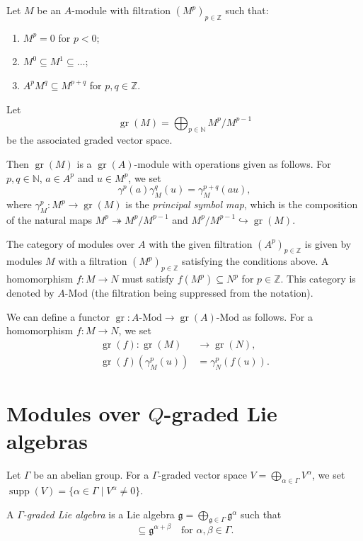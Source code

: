 \documentclass[a4paper, 12pt, reqno]{amsart}
\DeclareMathOperator{\gr}{gr}
\DeclareMathOperator{\supp}{supp}
\begin{document}
Let $M$ be an $A$-module with filtration $(M^p)_{p \in \mathbb{Z}}$ such that:
\begin{enumerate}
\item $M^p = 0$ for $p < 0$;
\item $M^0 \subseteq M^1 \subseteq \dots$;
\item $A^pM^q \subseteq M^{p + q}$ for $p, q \in \mathbb{Z}$.
\end{enumerate}
Let
\begin{equation*}
  \gr(M) = \bigoplus_{p \in \mathbb{N}}M^p/M^{p - 1}
\end{equation*}
be the associated graded vector space.

Then $\gr(M)$ is a $\gr(A)$-module with operations given as follows.
For $p, q \in \mathbb{N}$, $a \in A^p$ and $u \in M^p$, we set
\begin{equation*}
  \gamma^p(a)\gamma^q_M(u) = \gamma^{p + q}_M(au),
\end{equation*}
where $\gamma^p_M: M^p \to \gr(M)$ is the \emph{principal symbol map}, which is the composition of the natural maps $M^p \twoheadrightarrow M^p/M^{p - 1}$ and $M^p/M^{p - 1} \hookrightarrow \gr(M)$.

The category of modules over $A$ with the given filtration $(A^p)_{p \in \mathbb{Z}}$ is given by modules $M$ with a filtration $(M^p)_{p \in \mathbb{Z}}$ satisfying the conditions above.
A homomorphism $f: M \to N$ must satisfy $f(M^p) \subseteq N^p$ for $p \in \mathbb{Z}$.
This category is denoted by $A\text{-Mod}$ (the filtration being suppressed from the notation).

We can define a functor $\gr: A\text{-Mod} \to \gr(A)\text{-Mod}$ as follows.
For a homomorphism $f: M \to N$, we set
\begin{align*}
  \gr(f): \gr(M) &\to \gr(N), \\
  \gr(f)(\gamma_M^p(u)) &= \gamma_N^p(f(u)).
\end{align*}

\section{Modules over $Q$-graded Lie algebras}
\label{sec:modules-over-q}

Let $\Gamma$ be an abelian group.
For a $\Gamma$-graded vector space $V = \bigoplus_{\alpha \in \Gamma}V^{\alpha}$, we set $\supp(V) = \{\alpha \in \Gamma \mid V^{\alpha} \neq 0\}$.

A \emph{$\Gamma$-graded Lie algebra} is a Lie algebra $\mathfrak{g} = \bigoplus_{\mathfrak{g} \in \Gamma}\mathfrak{g}^{\alpha}$ such that
\begin{equation*}
  [\mathfrak{g}^{\alpha}, \mathfrak{g}^{\beta}] \subseteq \mathfrak{g}^{\alpha + \beta} \quad \text{for $\alpha, \beta \in \Gamma$}.
\end{equation*}
\end{document}
